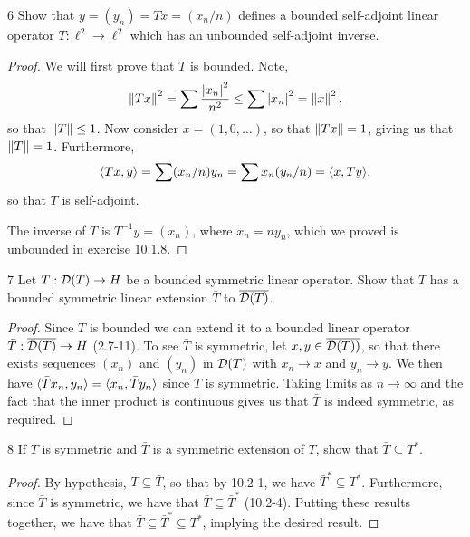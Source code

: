 \begin{exercise}{6}
Show that $y = (y_n) = Tx = (x_n / n)$ defines a bounded self-adjoint linear operator $T: \ell^2 \to \ell^2$ which has an unbounded self-adjoint inverse.
\end{exercise}
\begin{proof}
We will first prove that $T$ is bounded.
Note,
\begin{align*}
    \left\lVert Tx\right\rVert^2
    = \sum \frac{\left\lvert x_n\right\rvert^2}{n^2}
    \leq \sum \left\lvert x_n\right\rvert^2
    = \left\lVert x\right\rVert^2,
\end{align*}
so that $\left\lVert T\right\rVert \leq 1$.
Now consider $x = (1, 0, \dots)$, so that $\left\lVert Tx\right\rVert = 1$, giving us that $\left\lVert T\right\rVert = 1$.
Furthermore, 
\begin{align*}
    \langle Tx, y\rangle 
    = \sum (x_n / n) \bar{y_n} 
    = \sum x_n (\bar{y_n} / n)
    = \langle x, Ty\rangle, 
\end{align*}
so that $T$ is self-adjoint.

The inverse of $T$ is $T^{-1}y = (x_n)$, where $x_n = n y_n$, which we proved is unbounded in exercise 10.1.8.
\end{proof} 

\begin{exercise}{7}
Let $T: \mathcal{D}(T) \to H$ be a bounded symmetric linear operator.
Show that $T$ has a bounded symmetric linear extension $\bar{T}$ to $\overline{\mathcal{D}(T)}$.
\end{exercise}
\begin{proof}
Since $T$ is bounded we can extend it to a bounded linear operator $\bar{T}: \overline{\mathcal{D}(T)} \to H$ (2.7-11).
To see $\bar{T}$ is symmetric, let $x, y \in \overline{\mathcal{D}(T))}$, so that there exists sequences $(x_n)$ and $(y_n)$ in $\mathcal{D}(T)$ with $x_n \to x$ and $y_n \to y$.
We then have $\langle \bar{T}x_n, y_n\rangle = \langle x_n, \bar{T}y_n\rangle$ since $T$ is symmetric.
Taking limits as $n \to \infty$ and the fact that the inner product is continuous gives us that $\bar{T}$ is indeed symmetric, as required.
\end{proof} 

\begin{exercise}{8}
If $T$ is symmetric and $\bar{T}$ is a symmetric extension of $T$, show that $\bar{T} \subseteq T^\ast$.
\end{exercise}
\begin{proof}
By hypothesis, $T \subseteq \bar{T}$, so that by 10.2-1, we have $\bar{T}^\ast \subseteq T^\ast$.
Furthermore, since $\bar{T}$ is symmetric, we have that $\bar{T} \subseteq \bar{T}^\ast$ (10.2-4).
Putting these results together, we have that $\bar{T} \subseteq \bar{T}^\ast \subseteq T^\ast$, implying the desired result.
\end{proof} 

